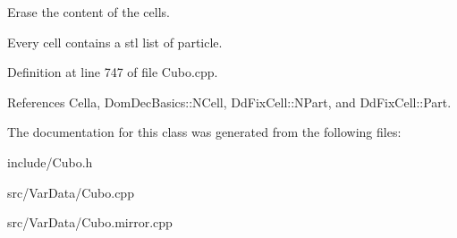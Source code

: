 \-Erase the content of the cells. 

\-Every cell contains a stl list of particle. 

\-Definition at line 747 of file \-Cubo.\-cpp.



\-References \-Cella, \-Dom\-Dec\-Basics\-::\-N\-Cell, \-Dd\-Fix\-Cell\-::\-N\-Part, and \-Dd\-Fix\-Cell\-::\-Part.



\-The documentation for this class was generated from the following files\-:\begin{DoxyCompactItemize}
\item 
include/\-Cubo.\-h\item 
src/\-Var\-Data/\-Cubo.\-cpp\item 
src/\-Var\-Data/\-Cubo.\-mirror.\-cpp\end{DoxyCompactItemize}
